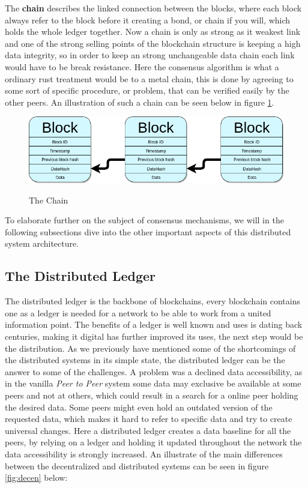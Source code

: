 \documentclass[paper=a4, fontsize=11pt]{scrartcl} %
\numberwithin{equation}{section} %
\numberwithin{figure}{section} %
\numberwithin{table}{section} %
\begin{document}
The \textbf{chain} describes the linked connection between the blocks, where each block always refer to the block before it creating a bond, or chain if you will, which holds the whole ledger together. Now a chain is only as strong as it weakest link and one of the strong selling points of the blockchain structure is keeping a high data integrity, so in order to keep an strong unchangeable data chain each link would have to be break resistance. Here the consensus algorithm is what a ordinary rust treatment would be to a metal chain, this is done by agreeing to some sort of specific procedure, or problem, that can be verified easily by the other peers\cite{consensus}. An illustration of such a chain can be seen below in figure \ref{fig:chain}.\\

\begin{figure}[H]
  \caption{The Chain}
  \centering
    \includegraphics[width=1\textwidth]{chain.png}
  \label{fig:chain}
\end{figure}

To elaborate further on the subject of consensus mechanisms, we will in the following subsections dive into the other important aspects of this distributed system architecture.


\subsection{The Distributed Ledger}

The distributed ledger is the backbone of blockchains, every blockchain contains one as a ledger is needed for a network to be able to work from a united information point. The benefits of a ledger is well known and uses is dating back centuries, making it digital has further improved its uses, the next step would be the distribution. As we previously have mentioned some of the shortcomings of the distributed systems in its simple state, the distributed ledger can be the answer to some of the challenges. A problem was a declined data accessibility, as in the vanilla \textit{Peer to Peer} system some data may exclusive be available at some peers and not at others, which could result in a search for a online peer holding the desired data. Some peers might even hold an outdated version of the requested data, which makes it hard to refer to specific data and try to create universal changes. Here a distributed ledger creates a data baseline for all the peers, by relying on a ledger and holding it updated throughout the network the data accessibility is strongly increased\cite{ledger}. An illustrate of the main differences between the decentralized and distributed systems can be seen in figure \ref{fig:decen} below: 
\end{document}
